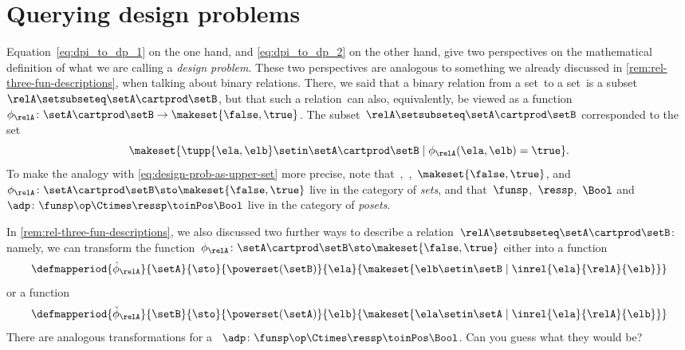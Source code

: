 
\section{Querying  design problems}
\label{sec:dp-querying}



Equation~\cref{eq:dpi_to_dp_1} on the one hand, and \cref{eq:dpi_to_dp_2} on the other hand, give two perspectives on the mathematical definition of what we are calling a \emph{design problem}.
These two perspectives are analogous to something we already discussed in \cref{rem:rel-three-fun-descriptions}, when talking about binary relations.
There, we said that a binary relation from a set~\setA to a set~\setB is a subset~$\relA \setsubseteq \setA \cartprod \setB$,
but that such a relation~\relA can also, equivalently, be viewed as a function~$\phi_{\relA}\colon \setA \cartprod\setB \to \makeset{ \false, \true }$.
The subset~$\relA \setsubseteq \setA \cartprod \setB$ corresponded to the set
\begin{equation}
    \makeset{ \tupp{\ela, \elb} \setin \setA \cartprod \setB \mid \phi_{\relA}(\ela, \elb) = \true }.
\end{equation}
%
To make the analogy with \cref{eq:design-prob-as-upper-set} more precise, note that~\setA,~\setB,~$\makeset{ \false, \true }$, and~$\phi_{\relA}\colon \setA \cartprod\setB \sto \makeset{ \false, \true }$ live in the category of \emph{sets}, and that~$\funsp$,~$\ressp$,~$\Bool$ and~$\adp\colon \funsp\op \Ctimes \ressp\toinPos \Bool$ live in the category of \emph{posets}.

In \cref{rem:rel-three-fun-descriptions}, we also discussed two further ways to describe a relation~$\relA \setsubseteq \setA \cartprod \setB$: namely, we can transform the function~$\phi_{\relA}\colon \setA \cartprod\setB \sto \makeset{ \false, \true }$ either into a function
\begin{equation}
    \label{eq:curried-relation-again}
    \defmapperiod{
        \hat \phi_{\relA}}{\setA}{\sto
    }{
        \powerset(\setB)
    }{
        \ela
    }{
        \makeset{ \elb \setin \setB \mid \inrel{\ela
            }{
                \relA
            }{
                \elb} }
    }
\end{equation}
or a function
\begin{equation}
    \label{eq:co-curried-relation-again}
    \defmapperiod{
        \check \phi_{\relA}}{\setB}{\sto
    }{
        \powerset (\setA)
    }{
        \elb
    }{
        \makeset{ \ela \setin \setA \mid \inrel{\ela
            }{
                \relA
            }{
                \elb}}
    }
\end{equation}
%
There are analogous transformations for a ~$\adp\colon \funsp\op \Ctimes \ressp\toinPos \Bool$.
Can you guess what they would be?

